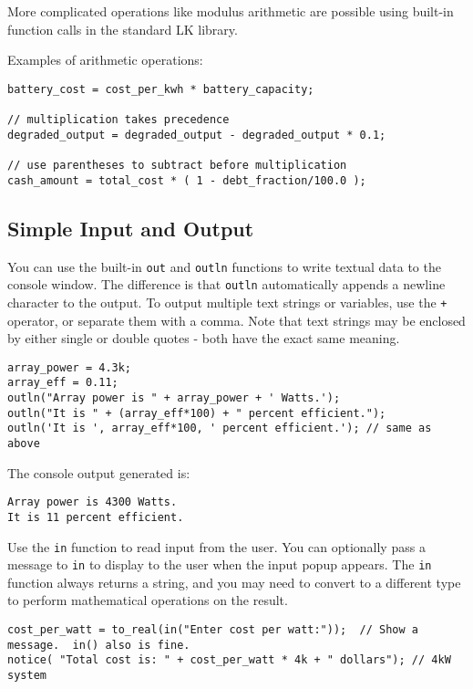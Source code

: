 \documentclass{article}
\begin{document}
More complicated operations like modulus arithmetic are possible using built-in function calls in the standard LK library.

Examples of arithmetic operations:
\begin{verbatim}
battery_cost = cost_per_kwh * battery_capacity;

// multiplication takes precedence
degraded_output = degraded_output - degraded_output * 0.1;

// use parentheses to subtract before multiplication
cash_amount = total_cost * ( 1 - debt_fraction/100.0 );

\end{verbatim}

\subsection{Simple Input and Output}

You can use the built-in \texttt{out} and \texttt{outln} functions to write textual data to the console window. The difference is that \texttt{outln} automatically appends a newline character to the output. To output multiple text strings or variables, use the \texttt{+} operator, or separate them with a comma.  Note that text strings may be enclosed by either single or double quotes - both have the exact same meaning.

\begin{verbatim}
array_power = 4.3k;
array_eff = 0.11;
outln("Array power is " + array_power + ' Watts.');
outln("It is " + (array_eff*100) + " percent efficient.");
outln('It is ', array_eff*100, ' percent efficient.'); // same as above
\end{verbatim}

The console output generated is:
\begin{verbatim}
Array power is 4300 Watts.
It is 11 percent efficient.
\end{verbatim}

Use the \texttt{in} function to read input from the user.  You can optionally pass a message to \texttt{in} to display to the user when the input popup appears. The \texttt{in} function always returns a string, and you may need to convert to a different type to perform mathematical operations on the result.

\begin{verbatim}
cost_per_watt = to_real(in("Enter cost per watt:"));  // Show a message.  in() also is fine.
notice( "Total cost is: " + cost_per_watt * 4k + " dollars"); // 4kW system
\end{verbatim}
\end{document}
